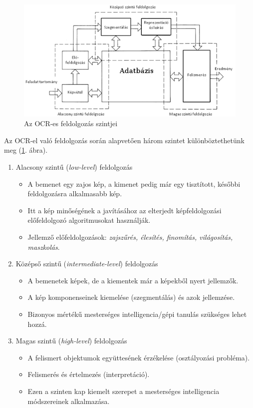 \begin{figure}[h]
\includegraphics[scale=0.65]{images/ocr}
\centering
\caption{Az OCR-es feldolgozás szintjei}
\label{fig:feldolgozasi_szintek}
\end{figure}

Az OCR-el való feldolgozás során alapvetően három szintet \cite{feldolgozasi_szintek} különböztethetünk meg (\ref{fig:feldolgozasi_szintek}. ábra). 

\begin{enumerate}
\item Alacsony szintű (\textit{low-level}) feldolgozás
	\begin{itemize}
	\item A bemenet egy zajos kép, a kimenet pedig már egy tisztított, későbbi feldolgozásra alkalmasabb kép.
	\item Itt a kép minőségének a javításához az elterjedt képfeldolgozási előfeldolgozó algoritmusokat használják.
	\item Jellemző előfeldolgozások: \textit{zajszűrés, élesítés, finomítás, világosítás, maszkolás}.
	\end{itemize}
\item Középső szintű (\textit{intermediate-level}) feldolgozás
	\begin{itemize}
	\item A bemenetek képek, de a kiementek már a képekből nyert jellemzők.
	\item A kép komponenseinek kiemelése (szegmentálás) és azok jellemzése.
	\item Bizonyos mértékű mesterséges intelligencia/gépi tanulás szükséges lehet hozzá.
	\end{itemize}
\item Magas szintű (\textit{high-level}) feldolgozás
	\begin{itemize}
	\item A felismert objektumok együttesének érzékelése (osztályozási probléma).
	\item Felismerés és értelmezés (interpretáció).
	\item Ezen a szinten kap kiemelt szerepet a mesterséges intelligencia módszereinek alkalmazása.
	\end{itemize}
\end{enumerate}

